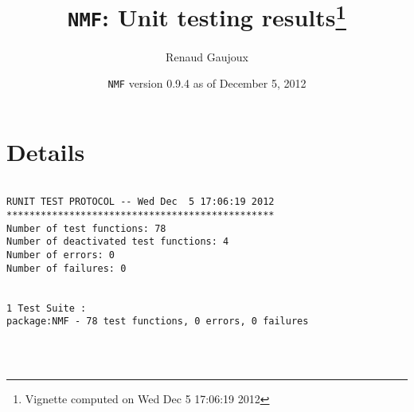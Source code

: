 \documentclass[10pt]{article}
\author{Renaud Gaujoux}
\title{\texttt{NMF}: Unit testing results\footnote{Vignette computed  on Wed Dec  5 17:06:19 2012}}
\date{\texttt{NMF} version 0.9.4 as of December  5, 2012}
\begin{document}
\maketitle

\section{Details}
\begin{verbatim}

RUNIT TEST PROTOCOL -- Wed Dec  5 17:06:19 2012 
*********************************************** 
Number of test functions: 78 
Number of deactivated test functions: 4 
Number of errors: 0 
Number of failures: 0 

 
1 Test Suite : 
package:NMF - 78 test functions, 0 errors, 0 failures




\end{verbatim}
\end{document}
